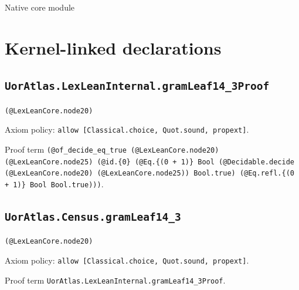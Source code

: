 \documentclass[11pt]{article}
\begin{document}
\begin{center}{\LARGE Native core module}\end{center}
\section*{Kernel-linked declarations}
\subsection*{\texttt{UorAtlas.LexLeanInternal.gramLeaf14\_3Proof}}
\noindent\texttt{(@LexLeanCore.node20)}\par
\noindent Axiom policy: \texttt{allow [Classical.choice, Quot.sound, propext]}.\par
\noindent Proof term \texttt{(@of\_decide\_eq\_true (@LexLeanCore.node20) (@LexLeanCore.node25) (@id.\{0\} (@Eq.\{(0 + 1)\} Bool (@Decidable.decide (@LexLeanCore.node20) (@LexLeanCore.node25)) Bool.true) (@Eq.refl.\{(0 + 1)\} Bool Bool.true)))}.\par
\subsection*{\texttt{UorAtlas.Census.gramLeaf14\_3}}
\noindent\texttt{(@LexLeanCore.node20)}\par
\noindent Axiom policy: \texttt{allow [Classical.choice, Quot.sound, propext]}.\par
\noindent Proof term \texttt{UorAtlas.LexLeanInternal.gramLeaf14\_3Proof}.\par
\end{document}
